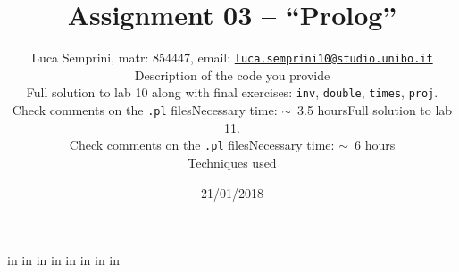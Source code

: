  in %
     in
     in      %
     in      %
     in
     in       %
     in
     in
    
\title{\vspace{-70pt}Assignment 03 -- ``Prolog''}
\author{Luca Semprini, matr: 854447, email: {\href{mailto:luca.semprini10@studio.unibo.it}{\texttt{luca.semprini10@studio.unibo.it}}}
\date{21/01/2018}




    \maketitle
    \vspace{-30pt}

    \subsection*{Description of the code you provide}

        \begin{itemize}
            \item 
                Full solution to lab 10 along with final exercises: \texttt{inv}, \texttt{double}, \texttt{times}, \texttt{proj}.
                \begin{itemize}
                    \item Check comments on the \texttt{.pl} files
                    \item Necessary time: $\sim$~3.5 hours
                \end{itemize}

            \item 
                Full solution to lab 11.
                \begin{itemize}
                    \item Check comments on the \texttt{.pl} files
                    \item Necessary time: $\sim$~6 hours
                \end{itemize}
        \end{itemize}

    \subsection*{Techniques used}

}
